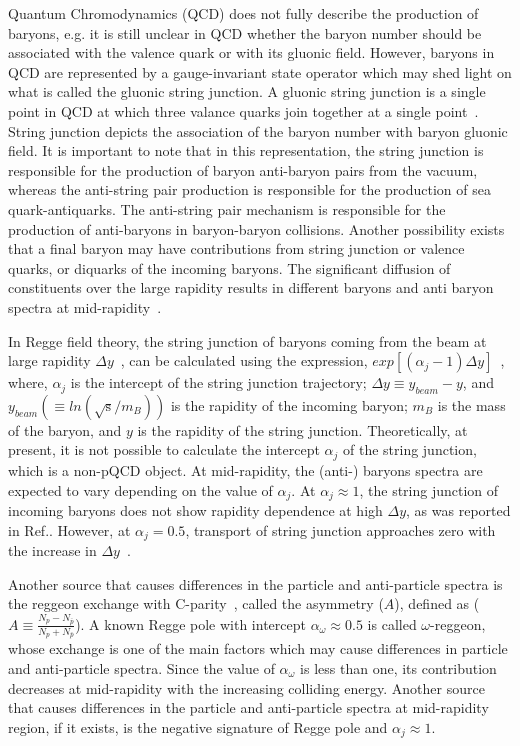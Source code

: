 \documentclass{article}
\newcommand{\sqrts}{\mbox{$\sqrt{\mathrm{s}}$}}
\begin{document}
Quantum Chromodynamics (QCD) does not fully describe the production of baryons, e.g. it is still unclear in QCD whether the baryon number should be associated with the valence quark or with its gluonic field. However, baryons in QCD are represented by a gauge-invariant state operator which may shed light on what is called the gluonic string junction. A gluonic string junction is a single point in QCD at which three valance quarks join together at a single point~\cite{4, 5}. String junction depicts the association of the baryon number with  baryon gluonic field. It is important to note that in this representation, the string junction is responsible for the production of baryon anti-baryon pairs from the vacuum, whereas the anti-string pair production is responsible for the production of sea quark-antiquarks. The anti-string pair mechanism is responsible for the production of anti-baryons in baryon-baryon collisions.  Another possibility exists that a final baryon may have contributions from string junction or valence quarks, or diquarks of the incoming baryons. The significant diffusion of constituents over the large rapidity results in different baryons and anti baryon spectra at mid-rapidity~\cite{4, 5, 6, 7, 8, 9, 10, 11, 12, 13, 14, 15, 16, 17}.

In Regge field theory, the string junction of baryons coming from the beam at large rapidity $\Delta y$~\cite{18, 19}, can be calculated using the expression, $exp [(\alpha_j - 1) \Delta y]$~\cite{4}, where, $\alpha_j$ is the intercept of the string junction trajectory; $\Delta y  \equiv y_{beam} - y$, and $y_{beam}( \equiv ln(\sqrts / m_B))$ is the rapidity of the incoming baryon; $m_B$ is the mass of the baryon, and $y$ is the rapidity of the string junction. Theoretically, at present, it is not possible to calculate the intercept $\alpha_j$ of the string junction, which is a non-pQCD object.  At mid-rapidity, the (anti-) baryons spectra are expected to vary depending on the value of $\alpha_j$. At $\alpha_j \approx 1$, the string junction of incoming baryons does not show rapidity dependence at high $\Delta y$, as was reported in Ref.\cite{5}. However, at $\alpha_j = 0.5$, transport of string junction approaches zero with the increase in $\Delta y$~\cite{4}.      

Another source that causes differences in the particle and anti-particle spectra is the reggeon exchange with C-parity~\cite{6}, called the asymmetry ($A$), defined as ($A \equiv \frac{N_{p} - N_{\bar{p}}}{N_{p} + N_{\bar{p}}}$). A known Regge pole with intercept $\alpha_{\omega} \approx 0.5$ is called $\omega$-reggeon, whose exchange is one of the main factors which may cause differences in particle and anti-particle spectra. Since the value of $\alpha_{\omega}$ is less than one, its contribution decreases at mid-rapidity with the increasing colliding energy. Another source that causes differences in the particle and anti-particle spectra at mid-rapidity region, if it exists, is the negative signature of Regge pole and $\alpha_j \approx 1$. 
\end{document}
